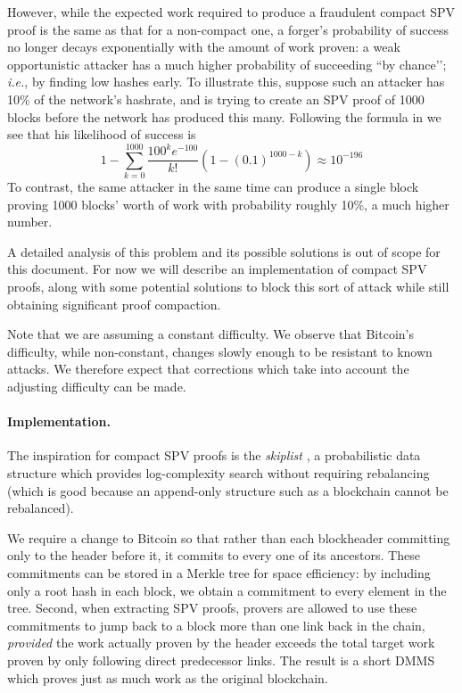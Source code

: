 \documentclass[letterpaper]{article}
\newcommand{\hashsig}{DMMS\xspace}
\begin{document}
\begin{appendices}
However, while the expected work required to produce a fraudulent
compact SPV proof is the same as that for a non-compact one, a forger's probability
of success no longer decays exponentially with the amount of work proven:
a weak opportunistic attacker has a much higher probability of
succeeding ``by chance’’; \emph{i.e.}, by finding low hashes early. To illustrate
this, suppose such an attacker has 10\% of the network’s hashrate, and is trying
to create an SPV proof of 1000 blocks before the network has produced this many.
Following the formula in \cite{nakamoto2009} we see that his likelihood of success is
\[ 1 - \sum_{k=0}^{1000} \frac{100^k e^{-100}}{k!} (1 - (0.1)^{1000-k}) \approx 10^{-196} \]
To contrast, the same attacker in the same time can produce a single block
proving 1000 blocks' worth of work with probability roughly 10\%, a much
higher number.

A detailed analysis of this problem and its possible solutions is out of scope
for this document. For now we will describe an implementation of compact SPV
proofs, along with some potential solutions to block this sort of attack while
still obtaining significant proof compaction.

Note that we are assuming a constant difficulty. We observe that Bitcoin's difficulty,
while non-constant, changes slowly enough to be resistant to known
attacks\cite{bahack2013}. We therefore expect that corrections which take into
account the adjusting difficulty can be made.
\paragraph{Implementation.} The inspiration for compact SPV proofs is the
\emph{skiplist} \cite{pugh1990}, a probabilistic data structure which provides
log-complexity search without requiring rebalancing (which is good because an
append-only structure such as a blockchain cannot be rebalanced).

We require a change to Bitcoin so that rather than each blockheader committing
only to the header before it,
it commits to every one of its ancestors. These commitments can be stored
in a Merkle tree for space efficiency: by including only a root hash in
each block, we obtain a commitment to every element in the tree. Second,
when extracting SPV proofs,
provers are allowed to use these commitments to jump back to a block more
than one link back in the chain, \emph{provided} the work actually proven
by the header exceeds the total target work proven by only following direct
predecessor links. The result is a short \hashsig which proves just as much
work as the original blockchain.


\end{appendices}
\end{document}
